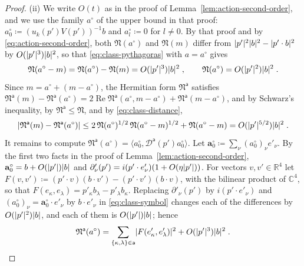 \documentclass[11pt]{preprint}
\DeclarePairedDelimiter{\abs}{\lvert}{\rvert}
\numberwithin{equation}{section}
\theoremstyle{definition}
\theoremstyle{remark}
\theoremstyle{plain}
\begin{document}
\begin{proof}
(ii) We write $O(t)$ as in the proof of Lemma~\ref{lem:action-second-order}, and we use the family $a^\circ$ of the upper bound in that proof: $a^\circ_0 \coloneqq (u_k(p')V(p'))^{-1}b$ and $a^\circ_l \coloneqq 0$ for $l \neq 0$. By that proof and by \eqref{eq:action-second-order}, both $\mathfrak N(a^\circ)$ and $\mathfrak N(m)$ differ from $\abs{p'}^2\abs b^2 - \abs{p' \cdot b}^2$ by $O(\abs{p'}^3)\abs b^2$, so that \eqref{eq:class-pythagoras} with $a = a^\circ$ gives
\begin{equation}\label{eq:class-distance}
    \mathfrak N(a^\circ - m) = \mathfrak N(a^\circ) - \mathfrak N(m) = O(\abs{p'}^3)\abs b^2\;,
    \qquad
    \mathfrak N(a^\circ) = O(\abs{p'}^2)\abs b^2\;.
\end{equation}
Since $m = a^\circ + (m - a^\circ)$, the Hermitian form $\mathfrak N^{\mathsf a}$ satisfies $\mathfrak N^{\mathsf a}(m) - \mathfrak N^{\mathsf a}(a^\circ) = 2\operatorname{Re}\mathfrak N^{\mathsf a}(a^\circ, m - a^\circ) + \mathfrak N^{\mathsf a}(m - a^\circ)$, and by Schwarz's inequality, by $\mathfrak N^{\mathsf a} \leq \mathfrak N$, and by \eqref{eq:class-distance},
\begin{equation}\label{eq:class-cross}
    \abs{\mathfrak N^{\mathsf a}(m) - \mathfrak N^{\mathsf a}(a^\circ)} \leq 2\,\mathfrak N(a^\circ)^{1/2}\,\mathfrak N(a^\circ - m)^{1/2} + \mathfrak N(a^\circ - m) = O(\abs{p'}^{5/2})\abs b^2\;.
\end{equation}
It remains to compute $\mathfrak N^{\mathsf a}(a^\circ) = \langle a^\circ_0, \mathcal D^{\mathsf a}(p')a^\circ_0\rangle$. Let $\mathbf a^\circ_0 \coloneqq \sum_\nu(a^\circ_0)_\nu e'_\nu$. By the first two facts in the proof of Lemma~\ref{lem:action-second-order}, $\mathbf a^\circ_0 = b + O(\abs{p'})\abs b$ and $\partial'_\nu(p') = i(p' \cdot e'_\nu)(1 + O(\eta\abs{p'}))$. For vectors $v, v' \in \mathbb R^4$ let $F(v, v') \coloneqq (p' \cdot v)(b \cdot v') - (p' \cdot v')(b \cdot v)$, with the bilinear product of $\mathbb C^4$, so that $F(e_\kappa, e_\lambda) = p'_\kappa b_\lambda - p'_\lambda b_\kappa$. Replacing $\partial'_\nu(p')$ by $i(p' \cdot e'_\nu)$ and $(a^\circ_0)_\nu = \mathbf a^\circ_0 \cdot e'_\nu$ by $b \cdot e'_\nu$ in \eqref{eq:class-symbol} changes each of the differences by $O(\abs{p'}^2)\abs b$, and each of them is $O(\abs{p'})\abs b$; hence
\begin{equation}\label{eq:class-trial}
    \mathfrak N^{\mathsf a}(a^\circ) = \sum_{\{ \kappa, \lambda \} \in \mathsf a}\abs{F(e'_\kappa, e'_\lambda)}^2 + O(\abs{p'}^3)\abs b^2\;.
\end{equation}

\end{proof}
\end{document}
